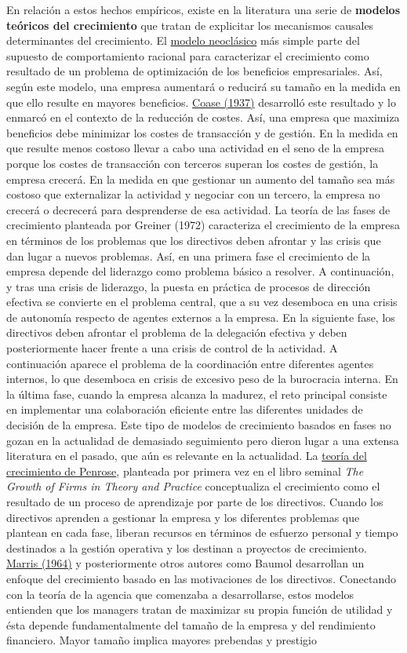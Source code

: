 \documentclass{nuevotema}
\begin{document}
En relación a estos hechos empíricos, existe en la literatura una serie de \textbf{modelos teóricos del crecimiento} que tratan de explicitar los mecanismos causales determinantes del crecimiento. El \underline{modelo neoclásico} más simple parte del supuesto de comportamiento racional para caracterizar el crecimiento como resultado de un problema de optimización de los beneficios empresariales. Así, según este modelo, una empresa aumentará o reducirá su tamaño en la medida en que ello resulte en mayores beneficios. \underline{Coase (1937)} desarrolló este resultado y lo enmarcó en el contexto de la reducción de costes. Así, una empresa que maximiza beneficios debe minimizar los costes de transacción y de gestión. En la medida en que resulte menos costoso llevar a cabo una actividad en el seno de la empresa porque los costes de transacción con terceros superan los costes de gestión, la empresa crecerá. En la medida en que gestionar un aumento del tamaño sea más costoso que externalizar la actividad y negociar con un tercero, la empresa no crecerá o decrecerá para desprenderse de esa actividad. La teoría de las fases de crecimiento planteada por Greiner (1972) caracteriza el crecimiento de la empresa en términos de los problemas que los directivos deben afrontar y las crisis que dan lugar a nuevos problemas. Así, en una primera fase el crecimiento de la empresa depende del liderazgo como problema básico a resolver. A continuación, y tras una crisis de liderazgo, la puesta en práctica  de procesos de dirección efectiva se convierte en el problema central, que a su vez desemboca en una crisis de autonomía respecto de agentes externos a la empresa. En la siguiente fase, los directivos deben afrontar el problema de la delegación efectiva y deben posteriormente hacer frente a una crisis de control de la actividad. A continuación aparece el problema de la coordinación entre diferentes agentes internos, lo que desemboca en crisis de excesivo peso de la burocracia interna. En la última fase, cuando la empresa alcanza la madurez, el reto principal consiste en implementar una colaboración eficiente entre las diferentes unidades de decisión de la empresa. Este tipo de modelos de crecimiento basados en fases no gozan en la actualidad de demasiado seguimiento pero dieron lugar a una extensa literatura en el pasado, que aún es relevante en la actualidad. La \underline{teoría del crecimiento de Penrose}, planteada por primera vez en el libro seminal \textit{The Growth of Firms in Theory and Practice} conceptualiza el crecimiento como el resultado de un proceso de aprendizaje por parte de los directivos. Cuando los directivos aprenden a gestionar la empresa y los diferentes problemas que plantean en cada fase, liberan recursos en términos de esfuerzo personal y tiempo destinados a la gestión operativa y los destinan a proyectos de crecimiento. \underline{Marris (1964)} y posteriormente otros autores como Baumol desarrollan un enfoque del crecimiento basado en las motivaciones de los directivos. Conectando con la teoría de la agencia que comenzaba a desarrollarse, estos modelos entienden que los managers tratan de maximizar su propia función de utilidad y ésta depende fundamentalmente del tamaño de la empresa y del rendimiento financiero. Mayor tamaño implica mayores prebendas y prestigio 
\end{document}
